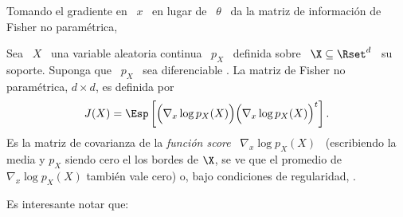Tomando el gradiente en  \ $x$ \ en
lugar de \ $\theta$ \ da la matriz de informaci\'on de Fisher no param\'etrica,
%
\begin{definicion}
  Sea \ $X$ \ una  variable aleatoria continua   \  $p_X$ \  definida  sobre \  $\X  \subseteq  \Rset^d$ \  su
  soporte.  Suponga que \ $p_X$ \ sea diferenciable .
  La matriz de Fisher no param\'etrica, $d \times d$, es definida por
  \[
  J(X) =  \Esp\left[ \Big(  \nabla_x \log p_X(X)  \Big) \Big(  \nabla_x \log
      p_X(X) \Big)^t \right].
  \]
  Es  la matriz  de covarianza  de  la {\it  funci\'on score}  \ $\nabla_x  \log
  p_X(X)$ \ (escribiendo la media y $p_X$  siendo cero el los bordes de $\X$, se
  ve que  el promedio  de $\nabla_x  \log p_X(X)$ tambi\'en  vale cero)  o, bajo
  condiciones   de    regularidad,   .
\end{definicion}
%
Es interesante notar que:
%

